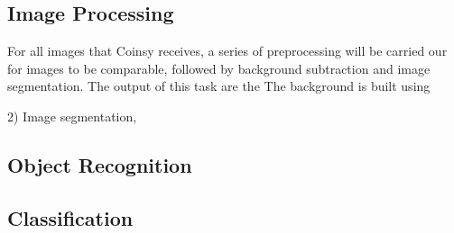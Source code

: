 \documentclass[main.tex]{subfiles}
\begin{document}
\subsection{Image Processing}
For all images that Coinsy receives, a series of preprocessing will be carried our for images to be comparable, followed by background subtraction and image segmentation. The output of this task are the The background is built using

2) Image segmentation,


\subsection{Object Recognition}


\subsection{Classification}
\end{document}
